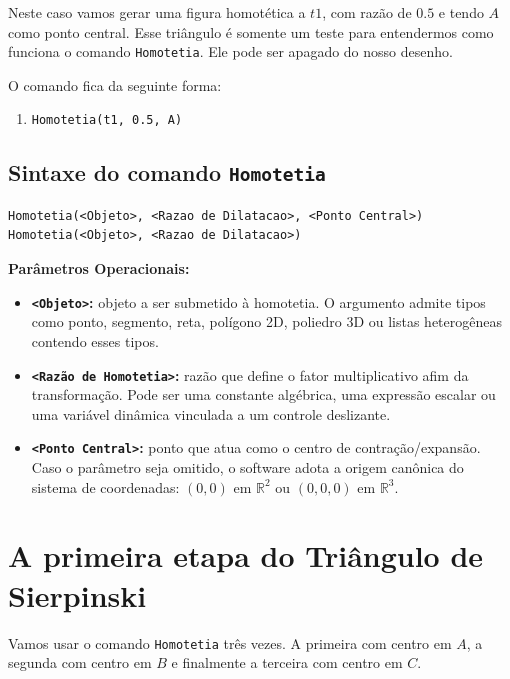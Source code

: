 \documentclass[12pt,a4paper]{report}
\begin{document}
	Neste caso vamos gerar uma figura homotética a $t1$, com razão de $0.5$ e tendo $A$ como ponto central. Esse triângulo é somente um teste para entendermos como funciona o comando \texttt{Homotetia}. Ele pode ser apagado do nosso desenho.
	
	O comando fica da seguinte forma:
	
	\begin{enumerate}[resume]
		\item \texttt{Homotetia(t1, 0.5, A)}
	\end{enumerate}
	
	\subsection{Sintaxe do comando \texttt{Homotetia}}
	
	\begin{destaque}
		\begin{verbatim}
Homotetia(<Objeto>, <Razao de Dilatacao>, <Ponto Central>)
Homotetia(<Objeto>, <Razao de Dilatacao>)
		\end{verbatim}
		
		\textbf{Parâmetros Operacionais:}
		\begin{itemize}
			\item \textbf{\texttt{<Objeto>}:} objeto a ser submetido à homotetia. O argumento admite tipos como ponto, segmento, reta, polígono 2D, poliedro 3D ou listas heterogêneas contendo esses tipos.
			\item \textbf{\texttt{<Razão de Homotetia>}:} razão que define o fator multiplicativo afim da transformação. Pode ser uma constante algébrica, uma expressão escalar ou uma variável dinâmica vinculada a um controle deslizante.
			\item \textbf{\texttt{<Ponto Central>}:} ponto que atua como o centro de contração/expansão. Caso o parâmetro seja omitido, o software adota a origem canônica do sistema de coordenadas: $(0,0)$ em $\mathbb{R}^2$ ou $(0,0,0)$ em $\mathbb{R}^3$.
		\end{itemize}
	\end{destaque}
	
	\section{A primeira etapa do Triângulo de Sierpinski}
	
	Vamos usar o comando \texttt{Homotetia} três vezes. A primeira com centro em $A$, a segunda com centro em $B$ e finalmente a terceira com centro em $C$. 
	
\end{document}
